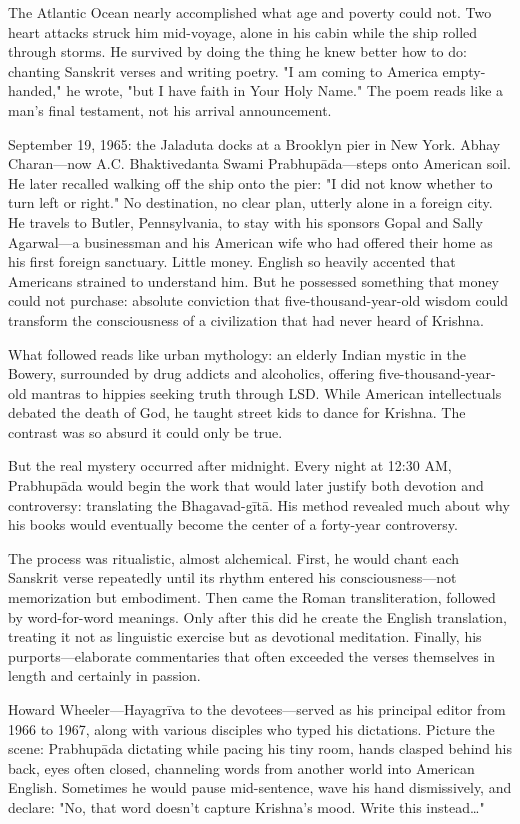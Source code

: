 \documentclass[12pt,twoside]{book}
\begin{document}
The Atlantic Ocean nearly accomplished what age and poverty could not. Two heart attacks struck him mid-voyage, alone in his cabin while the ship rolled through storms. He survived by doing the thing he knew better how to do: chanting Sanskrit verses and writing poetry. "I am coming to America empty-handed," he wrote, "but I have faith in Your Holy Name." The poem reads like a man's final testament, not his arrival announcement.

September 19, 1965: the Jaladuta docks at a Brooklyn pier in New York. Abhay Charan—now A.C. Bhaktivedanta Swami Prabhupāda—steps onto American soil. He later recalled walking off the ship onto the pier: "I did not know whether to turn left or right." No destination, no clear plan, utterly alone in a foreign city. He travels to Butler, Pennsylvania, to stay with his sponsors Gopal and Sally Agarwal—a businessman and his American wife who had offered their home as his first foreign sanctuary. Little money. English so heavily accented that Americans strained to understand him. But he possessed something that money could not purchase: absolute conviction that five-thousand-year-old wisdom could transform the consciousness of a civilization that had never heard of Krishna.

What followed reads like urban mythology: an elderly Indian mystic in the Bowery, surrounded by drug addicts and alcoholics, offering five-thousand-year-old mantras to hippies seeking truth through LSD. While American intellectuals debated the death of God, he taught street kids to dance for Krishna. The contrast was so absurd it could only be true.

But the real mystery occurred after midnight. Every night at 12:30 AM, Prabhupāda would begin the work that would later justify both devotion and controversy: translating the Bhagavad-gītā. His method revealed much about why his books would eventually become the center of a forty-year controversy.

The process was ritualistic, almost alchemical. First, he would chant each Sanskrit verse repeatedly until its rhythm entered his consciousness—not memorization but embodiment. Then came the Roman transliteration, followed by word-for-word meanings. Only after this did he create the English translation, treating it not as linguistic exercise but as devotional meditation. Finally, his purports—elaborate commentaries that often exceeded the verses themselves in length and certainly in passion.

Howard Wheeler—Hayagrīva to the devotees—served as his principal editor from 1966 to 1967, along with various disciples who typed his dictations. Picture the scene: Prabhupāda dictating while pacing his tiny room, hands clasped behind his back, eyes often closed, channeling words from another world into American English. Sometimes he would pause mid-sentence, wave his hand dismissively, and declare: "No, that word doesn't capture Krishna's mood. Write this instead\ldots{}"
\end{document}
